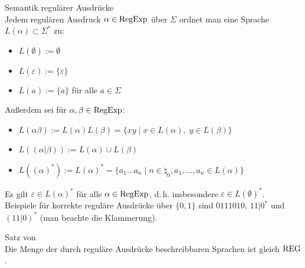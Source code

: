 \begin{Def}{Semantik regulärer Ausdrücke}\\
    Jedem regulären Ausdruck $\alpha \in \text{RegExp}$ über $\Sigma$ ordnet man eine
    Sprache $L(\alpha) \subset \Sigma^\ast$ zu:
    \begin{itemize}
        \item
        $L(\emptyset) := \emptyset$

        \item
        $L(\varepsilon) := \{\varepsilon\}$

        \item
        $L(a) := \{a\}$ für alle $a \in \Sigma$
    \end{itemize}
    Außerdem sei für $\alpha, \beta \in \text{RegExp}$:
    \begin{itemize}
        \item
        $L(\alpha \beta) := L(\alpha) L(\beta) =
        \{xy \;|\; x \in L(\alpha),\; y \in L(\beta)\}$

        \item
        $L((\alpha|\beta)) := L(\alpha) \cup L(\beta)$

        \item
        $L((\alpha)^\ast) := L(\alpha)^\ast =
        \{a_1 \dotsc a_n \;|\; n \in \natural_0,
        a_1, \dotsc, a_n \in L(\alpha)\}$
    \end{itemize}
\end{Def}

\begin{Bem}
    Es gilt $\varepsilon \in L(\alpha)^\ast$ für alle $\alpha \in \text{RegExp}$,
    d.\,h. insbesondere $\varepsilon \in L(\emptyset)^\ast$.\\
    Beispiele für korrekte reguläre Ausdrücke über $\{0, 1\}$ sind
    $0111010$, $11|0^\ast$ und $(11|0)^\ast$ (man beachte die Klammerung).
\end{Bem}

\linie
\pagebreak

\begin{Satz}{Satz von \upshape\,\!}\\
    Die Menge der durch reguläre Ausdrücke beschreibbaren Sprachen ist gleich
    $\text{REG}$.
\end{Satz}

